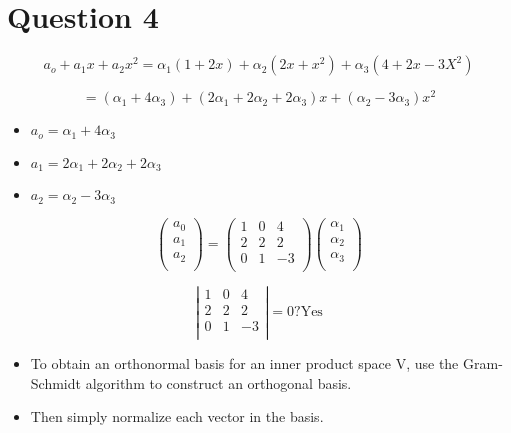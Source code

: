\documentclass[12pt, a4paper]{report}
\theoremstyle{plain}
\theoremstyle{definition}
\theoremstyle{remark}
\begin{document}
{{}
\newpage
{\Large
\section*{Question 4}
\[a_o + a_1x + a_2x^2 = \alpha_1(1+2x) + \alpha_2(2x+x^2)+\alpha_3(4+2x-3X^2)\]

\[=(\alpha_1+4\alpha_3) + (2\alpha_1 + 2\alpha_2 + 2\alpha_3)x + (\alpha_2-3\alpha_3)x^2\]

\begin{itemize}
\item $a_o =  \alpha_1+4\alpha_3$
\item $a_1 = 2\alpha_1 + 2\alpha_2 + 2\alpha_3$
\item $a_2 = \alpha_2-3\alpha_3$
\end{itemize}

\[\left(\begin{array}{ccc}
 a_0\\
 a_1\\
 a_2\\
\end{array}\right)= \left(\begin{array}{ccc}
1 &0& 4\\
2 &2& 2\\
0 &1& -3\\
\end{array}\right)
\left( \begin{array}{ccc}
 \alpha_1\\
 \alpha_2\\
 \alpha_3\\
\end{array}\right)\]

\[
\left|\begin{array}{ccc}
1 &0& 4\\
2 &2& 2\\
0 &1& -3\\
\end{array}\right| =0? \mbox{Yes}\]
}





\newpage
{ \Large
\begin{itemize}
\item To obtain an orthonormal basis for an inner product space V, use the Gram-Schmidt algorithm to construct an orthogonal basis. \item Then simply normalize each vector in the basis.
\end{itemize}

}}
\end{document}

